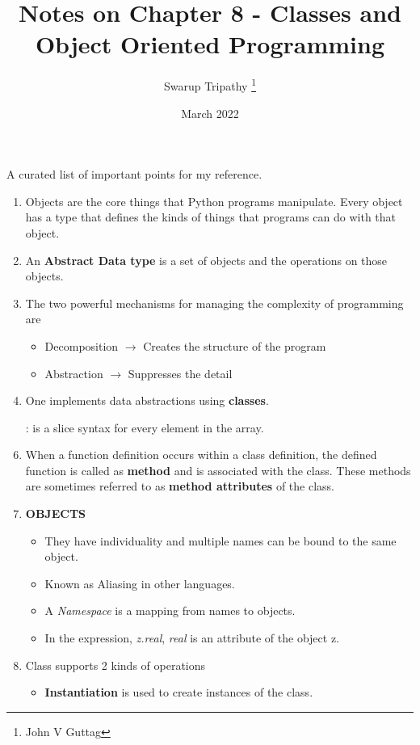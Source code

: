 \documentclass[11pt]{article}
\title{Notes on Chapter 8 - Classes and Object Oriented Programming}
\author{Swarup Tripathy \thanks{John V Guttag}}
\date{March 2022}
\begin{document}
    \maketitle
    A curated list of important points for my reference.\\
    \begin{enumerate}
        \item Objects are the core things that Python programs manipulate. Every object has a type that defines the kinds of things that programs can do with that object.
        \item An \textbf{Abstract Data type} is a set of objects and the operations on those objects.
        \item The two powerful mechanisms for managing the complexity of programming are 
        \begin{itemize}
            \item Decomposition $\rightarrow$ Creates the structure of the program
            \item Abstraction $\rightarrow$ Suppresses the detail
        \end{itemize}   
        \item One implements data abstractions using \textbf{classes}.     
        \item [:] is a slice syntax for every element in the array.
        \item When a function definition occurs within a class definition, the defined function is called as \textbf{method} and is associated with the class. These methods are sometimes referred to as \textbf{method attributes} of the class.
        \item \textbf{OBJECTS}
        \begin{itemize}
            \item They have individuality and multiple names can be bound to the same object.
            \item Known as Aliasing in other languages.
            \item A \textit{Namespace} is a mapping from names to objects.
            \item In the expression, \textit{z.real}, \textit{real} is an attribute of the object z.
        \end{itemize}
        \item Class supports 2 kinds of operations
        \begin{itemize}
            \item \textbf{Instantiation} is used to create instances of the class. 
            

\end{itemize}
\end{enumerate}
\end{document}
